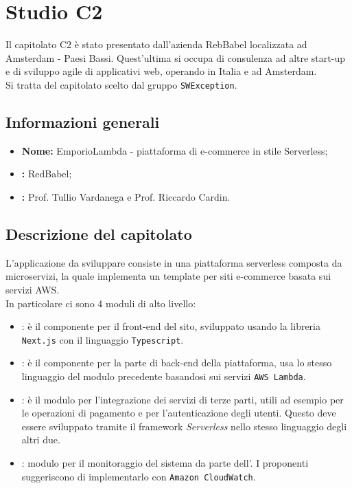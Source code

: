 \section{Studio C2}
Il capitolato C2 è stato presentato dall'azienda RebBabel localizzata ad Amsterdam - Paesi Bassi. Quest'ultima si occupa di consulenza ad altre start-up e di sviluppo agile di applicativi web, operando in Italia e ad Amsterdam.\\
Si tratta del capitolato scelto dal gruppo \verb|SWException|.

\subsection{Informazioni generali}
\begin{itemize}
	\item \textbf{Nome:} EmporioLambda - piattaforma di e-commerce in stile Serverless;
	\item \textbf{:} RedBabel;
	\item \textbf{:} Prof. Tullio Vardanega e Prof. Riccardo Cardin.
\end{itemize}

\subsection{Descrizione del capitolato}
L'applicazione da sviluppare consiste in una piattaforma serverless composta da microservizi, la quale implementa un template per siti e-commerce basata sui servizi AWS.\\
In particolare ci sono 4 moduli di alto livello:
\begin{itemize}
	\item {}: è il componente per il front-end del sito, sviluppato usando la libreria \verb|Next.js| con il linguaggio \verb|Typescript|.
	\item {}: è il componente per la parte di back-end della piattaforma, usa lo stesso linguaggio del modulo precedente basandosi sui servizi \verb|AWS Lambda|.
	\item {}: è il modulo per l'integrazione dei servizi di terze parti, utili ad esempio per le operazioni di pagamento e per l'autenticazione degli utenti. Questo deve essere sviluppato tramite il framework \textit{Serverless} nello stesso linguaggio degli altri due.
	\item {}: modulo per il monitoraggio del sistema da parte dell'. I proponenti suggeriscono di implementarlo con \verb|Amazon CloudWatch|.
\end{itemize}

